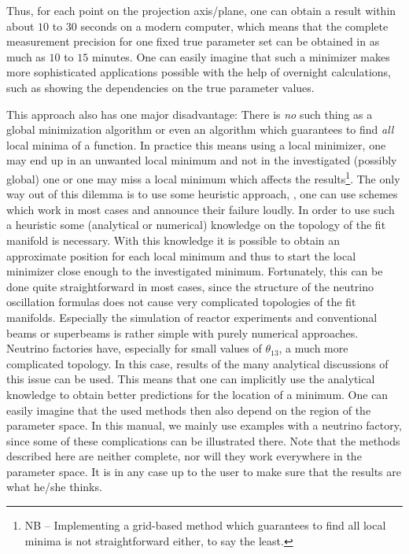 Thus, for each point on the projection axis/plane, one can obtain a result within about $10$ to $30$ seconds on a modern computer, which means that the complete measurement precision for one fixed true parameter set can be obtained in as much as $10$ to $15$ minutes. One can easily imagine that such a minimizer makes more sophisticated applications possible with the help of overnight calculations, such as showing the dependencies on the true parameter values.

This approach also has one major disadvantage: There is \emph{no} such
thing as a global minimization algorithm or even an algorithm which guarantees
to find \emph{all} local minima of a function. In practice this means using 
 a local minimizer, one may end up in an unwanted local minimum and not in 
the investigated (possibly global) one or 
one may miss a local minimum which affects the results\footnote{NB -- 
Implementing a grid-based method which guarantees to find all local minima is
not straightforward either, to say the least.}. 
The only way out of this dilemma is to use some heuristic approach, \ie , 
one can use schemes which work
in most cases and announce their failure loudly. In order to use such a
heuristic some (analytical or numerical) knowledge on the topology of 
the fit manifold is necessary. With this knowledge it is possible
to obtain an approximate position for each local minimum 
and thus to start the local minimizer 
close enough to the investigated minimum.
 Fortunately, this can be done quite straightforward in most cases, since 
the structure of the neutrino oscillation formulas does not cause very 
complicated topologies of the fit manifolds. Especially the simulation of 
reactor experiments and conventional beams or superbeams is rather simple 
with purely numerical
approaches. Neutrino factories have, especially for small values of
$\theta_{13}$, a much more complicated topology. In this case, results
of the many analytical discussions of this issue can be used. This means
 that one can implicitly use the analytical knowledge to obtain 
better predictions for the location of a minimum. One can easily imagine 
that the used methods then also depend
on the region of the parameter space. In this manual, we mainly use
examples with a neutrino factory, since some of these complications
can be illustrated there. Note that the methods described here are neither
complete, nor will they work everywhere in the parameter space. It is
in any case up to the user to make sure that the results are what he/she
thinks.

